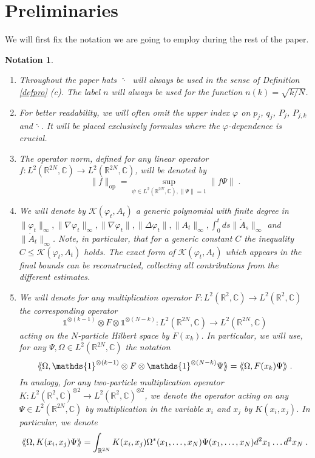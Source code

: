 \documentclass[11pt, english, american]{article}
\newcommand{\laa}{\langle\hspace{-0.08cm}\langle}
\newcommand{\raa}{\rangle\hspace{-0.08cm}\rangle}
\newcommand{\LZN}{L^2(\mathbb{R}^{2N},\mathbb{C})}
\newtheorem{notation}[theorem]{Notation}
\renewcommand{\phi}{\varphi}
\begin{document}
\section{Preliminaries}\label{secpre}

We will first fix the notation we are going to employ during the rest of the paper.
\begin{notation}
\begin{enumerate}
 \item
Throughout the paper hats $\;\widehat{\cdot}\;$ will always be
used in the sense of Definition \ref{defpro} (c). The label $n$ will always be used for the function $n(k)=\sqrt{k/N}$.
\item
For better readability, we will often omit the upper index $\phi$ on $p_j$,
$q_j$, $P_j$, $P_{j,k}$ and $\widehat{\cdot}$. It will be placed exclusively formulas where the $\phi$-dependence is crucial.


\item
The operator norm, defined for any linear operator $f:\LZN\to\LZN$, will be denoted by
$$\|f\|_{\text{op}}=\sup_{\psi \in \LZN, \|\Psi\|=1}\|f\Psi\|\;.$$

\item
We will
denote by $\mathcal{K}(\phi_t, A_t)$ a generic polynomial with finite degree  in \\
$\|\phi_t\|_\infty, \|\nabla \phi_t\|_\infty, \|\nabla \phi_t\|, \| \Delta \phi_t \|, \|A_t\|_\infty,
\int_0^t ds \| \dot A_s \|_\infty
$ and $ \| \dot A_t \|_\infty$. Note, in particular, that for a generic constant $C$ the inequality
$C \leq \mathcal{K}(\phi_t, A_t)$ holds.
 The exact form of $\mathcal{K}(\phi_t, A_t)$ which appears in the final bounds can be reconstructed, collecting all contributions from the different estimates.
 \item
We will denote for any multiplication operator 
 $ F:L^2(\mathbb{R}^2, \mathbb{C}) \rightarrow L^2(\mathbb{R}^2, \mathbb{C}) $
 the corresponding operator 
 $$
 \mathds{1}^{\otimes (k-1)} \otimes F \otimes  \mathds{1}^{\otimes (N-k)} :
 L^2(\mathbb{R}^{2N}, \mathbb{C}) \rightarrow L^2(\mathbb{R}^{2N}, \mathbb{C}) 
 $$
 acting on the $N$-particle Hilbert space
 by $F(x_k)$. In particular, we will use, for any $ \Psi,\Omega \in  L^2(\mathbb{R}^{2N}, \mathbb{C})$ the notation
 $$
 \laa \Omega,  \mathds{1}^{\otimes (k-1)} \otimes F \otimes  \mathds{1}^{\otimes (N-k)}\Psi \raa
 =
 \laa \Omega, F(x_k) \Psi \raa 
 \;.
 $$
 In analogy, for any two-particle multiplication operator $K:L^2(\mathbb{R}^2, \mathbb{C}) ^{\otimes 2}\rightarrow L^2(\mathbb{R}^2, \mathbb{C})^{\otimes 2} $, we denote the operator acting on any $ \Psi \in  L^2(\mathbb{R}^{2N}, \mathbb{C})$ by multiplication
 in the variable $x_i$ and $x_j$ by $K(x_i,x_j)$. In particular, we denote
 $$
  \laa \Omega, K(x_i,x_j) \Psi \raa 
  =
\int_{\mathbb{R}^{2N}} 
K(x_i, x_j)
 \Omega^*(x_1,\ldots,x_N) \Psi  (x_1,\ldots,x_N) d^2x_1 \dots d^2x_N   \;.
 $$
\end{enumerate}
\end{notation}
\end{document}
